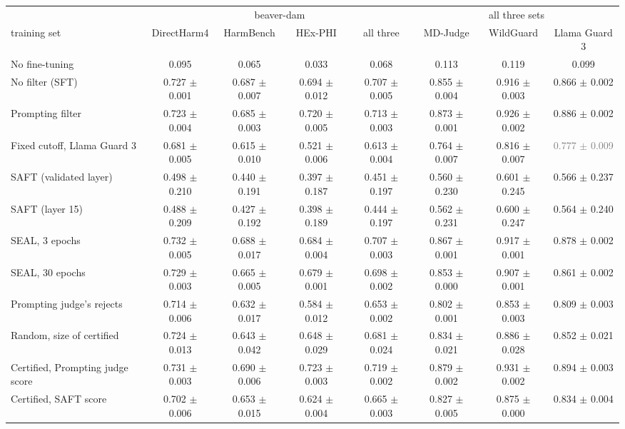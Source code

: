 \begin{tabular}{lccccccc}
\toprule
 & \multicolumn{4}{c}{beaver-dam} & \multicolumn{3}{c}{all three sets} \\
\cmidrule(lr){2-5}\cmidrule(lr){6-8}
training set & DirectHarm4 & HarmBench & HEx-PHI & all three & MD-Judge & WildGuard & Llama Guard 3 \\
\midrule
No fine-tuning & 0.095 & 0.065 & 0.033 & 0.068 & 0.113 & 0.119 & 0.099 \\
No filter (SFT) & 0.727 $\pm$ 0.001 & 0.687 $\pm$ 0.007 & 0.694 $\pm$ 0.012 & 0.707 $\pm$ 0.005 & 0.855 $\pm$ 0.004 & 0.916 $\pm$ 0.003 & 0.866 $\pm$ 0.002 \\
Prompting filter & 0.723 $\pm$ 0.004 & 0.685 $\pm$ 0.003 & 0.720 $\pm$ 0.005 & 0.713 $\pm$ 0.003 & 0.873 $\pm$ 0.001 & 0.926 $\pm$ 0.002 & 0.886 $\pm$ 0.002 \\
Fixed cutoff, Llama Guard 3 & 0.681 $\pm$ 0.005 & 0.615 $\pm$ 0.010 & 0.521 $\pm$ 0.006 & 0.613 $\pm$ 0.004 & 0.764 $\pm$ 0.007 & 0.816 $\pm$ 0.007 & \textcolor{gray}{0.777 $\pm$ 0.009} \\
SAFT (validated layer) & 0.498 $\pm$ 0.210 & 0.440 $\pm$ 0.191 & 0.397 $\pm$ 0.187 & 0.451 $\pm$ 0.197 & 0.560 $\pm$ 0.230 & 0.601 $\pm$ 0.245 & 0.566 $\pm$ 0.237 \\
SAFT (layer 15) & 0.488 $\pm$ 0.209 & 0.427 $\pm$ 0.192 & 0.398 $\pm$ 0.189 & 0.444 $\pm$ 0.197 & 0.562 $\pm$ 0.231 & 0.600 $\pm$ 0.247 & 0.564 $\pm$ 0.240 \\
SEAL, 3 epochs & 0.732 $\pm$ 0.005 & 0.688 $\pm$ 0.017 & 0.684 $\pm$ 0.004 & 0.707 $\pm$ 0.003 & 0.867 $\pm$ 0.001 & 0.917 $\pm$ 0.001 & 0.878 $\pm$ 0.002 \\
SEAL, 30 epochs & 0.729 $\pm$ 0.003 & 0.665 $\pm$ 0.005 & 0.679 $\pm$ 0.001 & 0.698 $\pm$ 0.002 & 0.853 $\pm$ 0.000 & 0.907 $\pm$ 0.001 & 0.861 $\pm$ 0.002 \\
Prompting judge's rejects & 0.714 $\pm$ 0.006 & 0.632 $\pm$ 0.017 & 0.584 $\pm$ 0.012 & 0.653 $\pm$ 0.002 & 0.802 $\pm$ 0.001 & 0.853 $\pm$ 0.003 & 0.809 $\pm$ 0.003 \\
Random, size of certified & 0.724 $\pm$ 0.013 & 0.643 $\pm$ 0.042 & 0.648 $\pm$ 0.029 & 0.681 $\pm$ 0.024 & 0.834 $\pm$ 0.021 & 0.886 $\pm$ 0.028 & 0.852 $\pm$ 0.021 \\
Certified, Prompting judge score & 0.731 $\pm$ 0.003 & 0.690 $\pm$ 0.006 & 0.723 $\pm$ 0.003 & 0.719 $\pm$ 0.002 & 0.879 $\pm$ 0.002 & 0.931 $\pm$ 0.002 & 0.894 $\pm$ 0.003 \\
Certified, SAFT score & 0.702 $\pm$ 0.006 & 0.653 $\pm$ 0.015 & 0.624 $\pm$ 0.004 & 0.665 $\pm$ 0.003 & 0.827 $\pm$ 0.005 & 0.875 $\pm$ 0.000 & 0.834 $\pm$ 0.004 \\

\end{tabular}

